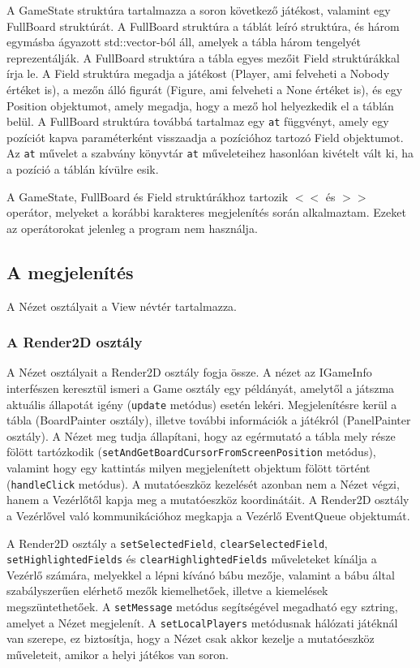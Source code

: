 \documentclass[12pt, twoside]{report}
\begin{document}
A GameState struktúra tartalmazza a soron következő játékost, valamint egy FullBoard struktúrát. A FullBoard struktúra a táblát leíró struktúra, és három egymásba ágyazott std::vector-ból áll, amelyek a tábla három tengelyét reprezentálják. A FullBoard struktúra a tábla egyes mezőit Field struktúrákkal írja le. A Field struktúra megadja a játékost (Player, ami felveheti a Nobody értéket is), a mezőn álló figurát (Figure, ami felveheti a None értéket is), és egy Position objektumot, amely megadja, hogy a mező hol helyezkedik el a táblán belül. A FullBoard struktúra továbbá tartalmaz egy {\tt at} függvényt, amely egy pozíciót kapva paraméterként visszaadja a pozícióhoz tartozó Field objektumot. Az {\tt at} művelet a szabvány könyvtár {\tt at} műveleteihez hasonlóan kivételt vált ki, ha a pozíció a táblán kívülre esik.

A GameState, FullBoard és Field struktúrákhoz tartozik $<<$ és $>>$ operátor, melyeket a korábbi karakteres megjelenítés során alkalmaztam. Ezeket az operátorokat jelenleg a program nem használja.

\subsection{A megjelenítés}

A Nézet osztályait a View névtér tartalmazza.

\subsubsection{A Render2D osztály}

A Nézet osztályait a Render2D osztály fogja össze. A nézet az IGameInfo interfészen keresztül ismeri a Game osztály egy példányát, amelytől a játszma aktuális állapotát igény ({\tt update} metódus) esetén lekéri. Megjelenítésre kerül a tábla (BoardPainter osztály), illetve további információk a játékról (PanelPainter osztály). A Nézet meg tudja állapítani, hogy az egérmutató a tábla mely része fölött tartózkodik ({\tt setAndGetBoardCursorFromScreenPosition} metódus), valamint hogy egy kattintás milyen megjelenített objektum fölött történt ({\tt handleClick} metódus). A mutatóeszköz kezelését azonban nem a Nézet végzi, hanem a Vezérlőtől kapja meg a mutatóeszköz koordinátáit. A Render2D osztály a Vezérlővel való kommunikációhoz megkapja a Vezérlő EventQueue objektumát.

A Render2D osztály a {\tt setSelectedField}, {\tt clearSelectedField}, {\tt setHighlightedFields} és {\tt clearHighlightedFields} műveleteket kínálja a Vezérlő számára, melyekkel a lépni kívánó bábu mezője, valamint a bábu által szabályszerűen elérhető mezők kiemelhetőek, illetve a kiemelések megszüntethetőek. A {\tt setMessage} metódus segítségével megadható egy sztring, amelyet a Nézet megjelenít. A {\tt setLocalPlayers} metódusnak hálózati játéknál van szerepe, ez biztosítja, hogy a Nézet csak akkor kezelje a mutatóeszköz műveleteit, amikor a helyi játékos van soron.
\end{document}
